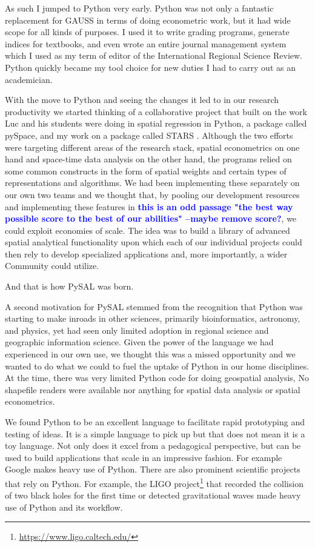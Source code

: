 \documentclass[11pt]{article}
\newcommand\ek[1]{\textcolor{blue}{\textbf{#1}}}
\begin{document}
As such I jumped to Python very early. Python was not only a fantastic
replacement for GAUSS in terms of doing econometric work, but it had wide scope
for all kinds of purposes. I used it to write grading programs, generate
indices for textbooks, and even wrote an entire journal management system which
I used as my term of editor of the International Regional Science Review.
Python quickly became my tool choice for new duties I had to carry out as an
academician. 

With the move to Python and seeing the changes it led to in our research
productivity we started thinking of a collaborative project that built on the
work Luc and his students were doing in spatial regression in Python, a package
called pySpace, and my work on a package called STARS \citep{rey_stars:_2006-3}.
Although the two efforts were targeting different areas of the research stack,
spatial econometrics on one hand and space-time data analysis on the other
hand, the programs relied on some common constructs in the form of spatial
weights and certain types of representations and algorithms. We had been
implementing these separately on our own two teams and we thought that, by
pooling our development resources and implementing these features in \ek{ this is an odd passage "the best
way possible score to the best of our abilities" --maybe remove score?}, we could exploit economies of
scale. The idea was to build a library of advanced spatial analytical
functionality upon which each of our individual projects could then rely to develop
specialized applications and, more importantly, a wider Community could
utilize.


And that is how PySAL was born.

A second motivation for PySAL stemmed from the recognition that Python was
starting to make inroads in other sciences, primarily bioinformatics,
astronomy, and physics, yet had seen only limited adoption in regional science
and geographic information science. Given the power of the language we had
experienced in our own use, we thought this was a missed opportunity and we
wanted to do what we could to fuel the uptake of Python in our home
disciplines. At the time, there was very limited Python code for doing
geospatial analysis, No shapefile readers were available nor anything for
spatial data analysis or spatial econometrics.

We found Python to be an excellent language to facilitate rapid prototyping and
testing of ideas. It is a simple language to pick up but that does not mean it
is a toy language. Not only does it excel from a pedagogical perspective, but
can be used to build applications that scale in an impressive fashion. For
example Google makes heavy use of Python. There are also prominent scientific
projects that rely on Python. For example, the LIGO project\footnote{\url{ https://www.ligo.caltech.edu/}} that recorded
the collision of two black holes for the first time or detected gravitational
waves made heavy use of Python and its workflow.
\end{document}
